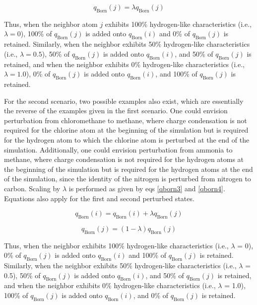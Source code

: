 \documentclass[12pt]{report}
\begin{document}
\begin{equation}
\label{qborn2}
q_{\textrm{Born}}(j) = \lambda q_{\textrm{Born}}(j)
\end{equation}
\vspace*{-0.7cm}

Thus, when the neighbor atom $j$ exhibits 100\% hydrogen-like characteristics (i.e., $\lambda = 0$), 100\% of $q_{\textrm{Born}}(j)$ is added onto $q_{\textrm{Born}}(i)$ and 0\% of $q_{\textrm{Born}}(j)$ is retained. Similarly, when the neighbor exhibits 50\% hydrogen-like characteristics (i.e., $\lambda = 0.5$), 50\% of $q_{\textrm{Born}}(j)$ is added onto $q_{\textrm{Born}}(i)$, and 50\% of $q_{\textrm{Born}}(j)$ is retained, and when the neighbor exhibits 0\% hydrogen-like characteristics (i.e., $\lambda = 1.0$), 0\% of $q_{\textrm{Born}}(j)$ is added onto $q_{\textrm{Born}}(i)$, and 100\% of $q_{\textrm{Born}}(j)$ is retained.

For the second scenario, two possible examples also exist, which are essentially the reverse of the examples given in the first scenario. One could envision perturbation from chloromethane to methane, where charge condensation is not required for the chlorine atom at the beginning of the simulation but is required for the hydrogen atom to which the chlorine atom is perturbed at the end of the simulation. Additionally, one could envision perturbation from ammonia to methane, where charge condensation is not required for the hydrogen atoms at the beginning of the simulation but is required for the hydrogen atoms at the end of the simulation, since the identity of the nitrogen is perturbed from nitrogen to carbon. Scaling by $\lambda$ is performed as given by eqs \ref{qborn3} and \ref{qborn4}. Equations also apply for the first and second perturbed states.

\vspace*{-.4cm}
\begin{equation}
\label{qborn3}
q_{\textrm{Born}}(i) = q_{\textrm{Born}}(i) + \lambda q_{\textrm{Born}}(j)
\end{equation}
\vspace*{-1.6cm}

\begin{equation}
\label{qborn4}
q_{\textrm{Born}}(j) = (1 - \lambda) q_{\textrm{Born}}(j)
\end{equation}
\vspace*{-0.7cm}

Thus, when the neighbor exhibits 100\% hydrogen-like characteristics (i.e., $\lambda$ = 0), 0\% of $q_{\textrm{Born}}(j)$ is added onto $q_{\textrm{Born}}(i)$ and 100\% of $q_{\textrm{Born}}(j)$ is retained. Similarly, when the neighbor exhibits 50\% hydrogen-like characteristics (i.e., $\lambda$ = 0.5), 50\% of $q_{\textrm{Born}}(j)$ is added onto $q_{\textrm{Born}}(i)$, and 50\% of $q_{\textrm{Born}}(j)$ is retained, and when the neighbor exhibits 0\% hydrogen-like characteristics (i.e., $\lambda$ = 1.0), 100\% of $q_{\textrm{Born}}(j)$ is added onto $q_{\textrm{Born}}(i)$, and 0\% of $q_{\textrm{Born}}(j)$ is retained.
\end{document}
